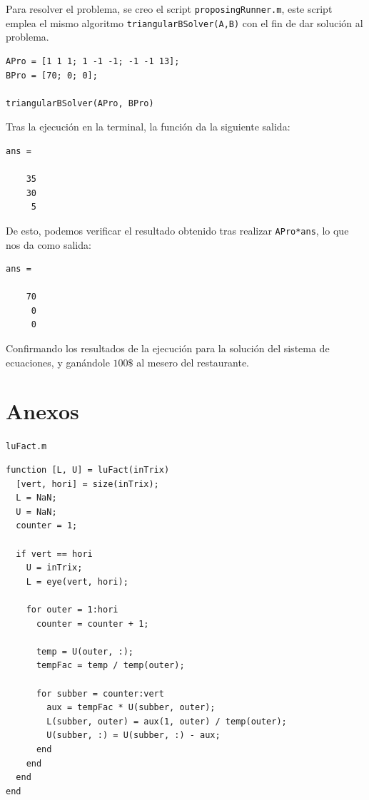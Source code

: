 \documentclass[english,notitlepage,letterpaper, 10pt]{article} %
\begin{document}
\begin{enumerate}
\begin{enumerate}
            Para resolver el problema, se creo el script \texttt{proposingRunner.m}, este script emplea el mismo algoritmo \texttt{triangular\-BSolver(A,B)} con el fin de dar solución al problema.

            \begin{lstlisting}
APro = [1 1 1; 1 -1 -1; -1 -1 13];
BPro = [70; 0; 0];

triangularBSolver(APro, BPro)
            \end{lstlisting}

            Tras la ejecución en la terminal, la función da la siguiente salida:

            \begin{lstlisting}
ans =

    35
    30
     5
            \end{lstlisting}

            De esto, podemos verificar el resultado obtenido tras realizar \texttt{APro*ans}, lo que nos da como salida:

            \begin{lstlisting}
ans =

    70
     0
     0
            \end{lstlisting}
            
            Confirmando los resultados de la ejecución para la solución del sistema de ecuaciones, y ganándole $100\$$ al mesero del restaurante.

        \end{enumerate}

\end{enumerate}

\newpage

\section{Anexos}

\texttt{luFact.m}

\begin{lstlisting}
function [L, U] = luFact(inTrix)
  [vert, hori] = size(inTrix);
  L = NaN;
  U = NaN;
  counter = 1;

  if vert == hori
    U = inTrix;
    L = eye(vert, hori);

    for outer = 1:hori
      counter = counter + 1;

      temp = U(outer, :);
      tempFac = temp / temp(outer);

      for subber = counter:vert
        aux = tempFac * U(subber, outer);
        L(subber, outer) = aux(1, outer) / temp(outer);
        U(subber, :) = U(subber, :) - aux;
      end
    end
  end
end
\end{lstlisting}
\end{document}
